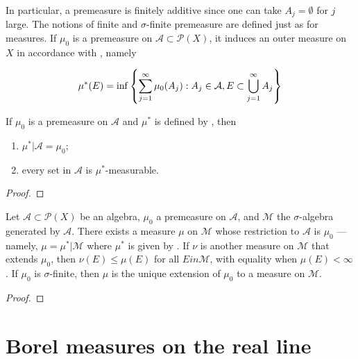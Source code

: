 In particular, a premeasure is finitely additive since one can take $A_j = \emptyset$ for $j$ large.
The notions of finite and $\sigma$-finite premeasure are defined just as for measures.
If $\mu_0$ is a premeasure on $\mathcal{A} \subset \mathcal{P}(X)$, it induces an outer measure on $X$ in accordance with , namely

\begin{align}
    \mu^*(E) = \inf \left\{ \sum_{j=1}^{\infty} \mu_0(A_j) : A_j \in \mathcal{A}, E \subset \bigcup_{j=1}^{\infty} A_j \right\} \labeq{premeasure_outer_measure}
\end{align}

\begin{proposition}
    If $\mu_0$ is a premeasure on $\mathcal{A}$ and $\mu^*$ is defined by , then
    \begin{enumerate}
        \item $\mu^*|\mathcal{A} = \mu_0$;
        \item every set in $\mathcal{A}$ is $\mu^*$-measurable.
    \end{enumerate}
\end{proposition}

\begin{proof}

\end{proof}

\begin{theorem}
    Let $\mathcal{A} \subset \mathcal{P}(X)$ be an algebra, $\mu_0$ a premeasure on $\mathcal{A}$, and $\mathcal{M}$ the $\sigma$-algebra generated by $\mathcal{A}$.
    There exists a measure $\mu$ on $\mathcal{M}$ whose restriction to $\mathcal{A}$ is $\mu_0$ --- namely, $\mu = \mu^* | \mathcal{M}$ where $\mu^*$ is given by .
    If $\nu$ is another measure on $\mathcal{M}$ that extends $\mu_0$, then $\nu(E) \le \mu(E)$ for all $E in \mathcal{M}$, with equality when $\mu(E) < \infty$.
    If $\mu_0$ is $\sigma$-finite, then $\mu$ is the unique extension of $\mu_0$ to a measure on $\mathcal{M}$.
\end{theorem}

\begin{proof}

\end{proof}

\section{Borel measures on the real line}

